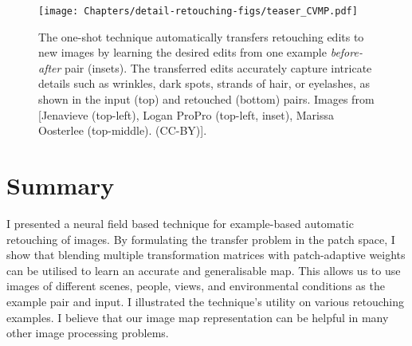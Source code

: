 \begin{figure}
  \texttt{[image: Chapters/detail-retouching-figs/teaser\_CVMP.pdf]}
  \caption{The one-shot technique automatically transfers retouching edits to new images by learning the desired edits from one example \textit{before-after} pair (insets). The transferred edits accurately capture intricate details such as wrinkles, dark spots, strands of hair, or eyelashes, as shown in the input (top) and retouched (bottom) pairs. Images from [Jenavieve (top-left), Logan ProPro (top-left, inset), Marissa Oosterlee (top-middle). (CC-BY)].}
  \label{fig:teaser}
\end{figure}
















\section{Summary}
I presented a neural field based technique for example-based automatic retouching of images. By formulating the transfer problem in the patch space, I show that blending multiple transformation matrices with patch-adaptive weights can be utilised to learn an accurate and generalisable map. This allows us to use images of different scenes, people, views, and environmental conditions as the example pair and input. I illustrated the technique's utility on various retouching examples. I believe that our image map representation can be helpful in many other image processing problems.


